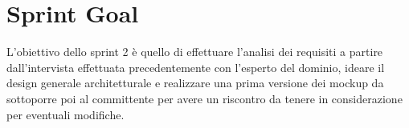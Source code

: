 \section{Sprint Goal}
L'obiettivo dello sprint 2 è quello di effettuare l'analisi dei requisiti a partire dall'intervista effettuata precedentemente con l'esperto del dominio, ideare il design generale architetturale e realizzare una prima versione dei mockup da sottoporre poi al committente per avere un riscontro da tenere in considerazione per eventuali modifiche.
